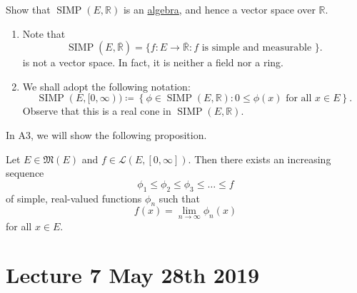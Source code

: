 \documentclass[notoc,notitlepage]{tufte-book}
\DeclareMathOperator{\SIMP}{SIMP}
\begin{document}
\begin{ex}
  Show that $\SIMP(E, \mathbb{R})$ is an
  \hyperref[defn:algebra_of_sets]{algebra}, and hence a vector space over
  $\mathbb{R}$.
\end{ex}

\begin{remark}
  \begin{enumerate}
    \item Note that
      \begin{equation*}
        \SIMP(E, \overline{\mathbb{R}}) = \{ f : E \to \overline{\mathbb{R}} : f
        \text{ is simple and measurable } \}.
      \end{equation*}
      is not a vector space. In fact, it is neither a field nor a ring.
    \item We shall adopt the following notation:
      \begin{equation*}
        \SIMP(E, [0, \infty)) \coloneqq \left\{ \phi \in \SIMP(E, \mathbb{R}) :
        0 \leq \phi(x) \text{ for all } x \in E \right\}.
      \end{equation*}
      Observe that this is a real cone in $\SIMP(E, \mathbb{R})$.
  \end{enumerate}
\end{remark}

In A3, we will show the following proposition.

\begin{propo}\label{propo:increasing_sequence_of_simple_functions_that_converges_to_a_measurable_function}
  Let $E \in \mathfrak{M}(E)$ and $f \in \mathcal{L}(E, [0, \infty])$. Then
  there exists an increasing sequence
  \begin{equation*}
    \phi_1 \leq \phi_2 \leq \phi_3 \leq \hdots \leq f
  \end{equation*}
  of simple, real-valued functions $\phi_n$ such that
  \begin{equation*}
    f(x) = \lim_{n \to \infty} \phi_n(x)
  \end{equation*}
  for all $x \in E$.
\end{propo}



\chapter{Lecture 7 May 28th 2019}%
\label{chp:lecture_7_may_28th_2019}
\end{document}
